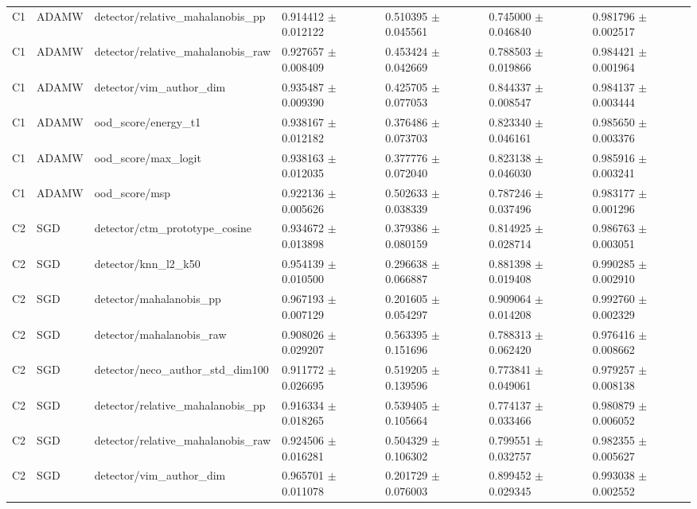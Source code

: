 \begin{longtable}{lllllll}
C1 & ADAMW & detector/relative\_mahalanobis\_pp & 0.914412 $\pm$ 0.012122 & 0.510395 $\pm$ 0.045561 & 0.745000 $\pm$ 0.046840 & 0.981796 $\pm$ 0.002517 \\
C1 & ADAMW & detector/relative\_mahalanobis\_raw & 0.927657 $\pm$ 0.008409 & 0.453424 $\pm$ 0.042669 & 0.788503 $\pm$ 0.019866 & 0.984421 $\pm$ 0.001964 \\
C1 & ADAMW & detector/vim\_author\_dim & 0.935487 $\pm$ 0.009390 & 0.425705 $\pm$ 0.077053 & 0.844337 $\pm$ 0.008547 & 0.984137 $\pm$ 0.003444 \\
C1 & ADAMW & ood\_score/energy\_t1 & 0.938167 $\pm$ 0.012182 & 0.376486 $\pm$ 0.073703 & 0.823340 $\pm$ 0.046161 & 0.985650 $\pm$ 0.003376 \\
C1 & ADAMW & ood\_score/max\_logit & 0.938163 $\pm$ 0.012035 & 0.377776 $\pm$ 0.072040 & 0.823138 $\pm$ 0.046030 & 0.985916 $\pm$ 0.003241 \\
C1 & ADAMW & ood\_score/msp & 0.922136 $\pm$ 0.005626 & 0.502633 $\pm$ 0.038339 & 0.787246 $\pm$ 0.037496 & 0.983177 $\pm$ 0.001296 \\
C2 & SGD & detector/ctm\_prototype\_cosine & 0.934672 $\pm$ 0.013898 & 0.379386 $\pm$ 0.080159 & 0.814925 $\pm$ 0.028714 & 0.986763 $\pm$ 0.003051 \\
C2 & SGD & detector/knn\_l2\_k50 & 0.954139 $\pm$ 0.010500 & 0.296638 $\pm$ 0.066887 & 0.881398 $\pm$ 0.019408 & 0.990285 $\pm$ 0.002910 \\
C2 & SGD & detector/mahalanobis\_pp & 0.967193 $\pm$ 0.007129 & 0.201605 $\pm$ 0.054297 & 0.909064 $\pm$ 0.014208 & 0.992760 $\pm$ 0.002329 \\
C2 & SGD & detector/mahalanobis\_raw & 0.908026 $\pm$ 0.029207 & 0.563395 $\pm$ 0.151696 & 0.788313 $\pm$ 0.062420 & 0.976416 $\pm$ 0.008662 \\
C2 & SGD & detector/neco\_author\_std\_dim100 & 0.911772 $\pm$ 0.026695 & 0.519205 $\pm$ 0.139596 & 0.773841 $\pm$ 0.049061 & 0.979257 $\pm$ 0.008138 \\
C2 & SGD & detector/relative\_mahalanobis\_pp & 0.916334 $\pm$ 0.018265 & 0.539405 $\pm$ 0.105664 & 0.774137 $\pm$ 0.033466 & 0.980879 $\pm$ 0.006052 \\
C2 & SGD & detector/relative\_mahalanobis\_raw & 0.924506 $\pm$ 0.016281 & 0.504329 $\pm$ 0.106302 & 0.799551 $\pm$ 0.032757 & 0.982355 $\pm$ 0.005627 \\
C2 & SGD & detector/vim\_author\_dim & 0.965701 $\pm$ 0.011078 & 0.201729 $\pm$ 0.076003 & 0.899452 $\pm$ 0.029345 & 0.993038 $\pm$ 0.002552 \\

\end{longtable}
